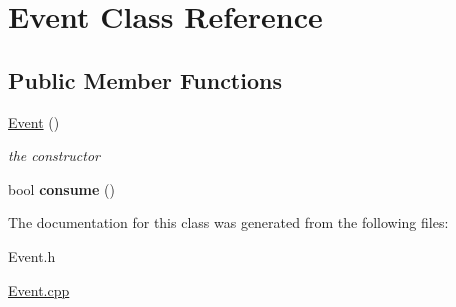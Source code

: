 \hypertarget{class_event}{}\section{Event Class Reference}
\label{class_event}
\subsection*{Public Member Functions}
\begin{DoxyCompactItemize}
\item 
\mbox{\label{class_event_a5a40dd4708297f7031e29b39e039ae10}} 
\hyperlink{class_event_a5a40dd4708297f7031e29b39e039ae10}{Event} ()
\begin{DoxyCompactList}\small\item\em the constructor \end{DoxyCompactList}\item 
\mbox{\label{class_event_a93521bedffd2a0b9c979e15241e060ba}} 
bool {\bfseries consume} ()
\end{DoxyCompactItemize}


The documentation for this class was generated from the following files\+:\begin{DoxyCompactItemize}
\item 
Event.\+h\item 
\hyperlink{_event_8cpp}{Event.\+cpp}\end{DoxyCompactItemize}
